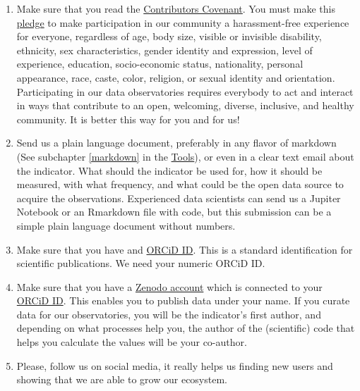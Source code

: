 \documentclass[
  a4paper,
  openany, a4paper, oneside]{book}
\begin{document}
\begin{enumerate}
\def\labelenumi{\arabic{enumi}.}
\item
  Make sure that you read the \href{https://www.contributor-covenant.org/}{Contributors Covenant}. You must make this \href{https://www.contributor-covenant.org/version/2/0/code_of_conduct/}{pledge} to make participation in our community a harassment-free experience for everyone, regardless of age, body size, visible or invisible disability, ethnicity, sex characteristics, gender identity and expression, level of experience, education, socio-economic status, nationality, personal appearance, race, caste, color, religion, or sexual identity and orientation. Participating in our data observatories requires everybody to act and interact in ways that contribute to an open, welcoming, diverse, inclusive, and healthy community. It is better this way for you and for us!
\item
  Send us a plain language document, preferably in any flavor of markdown (See subchapter \ref{markdown} in the \protect\hyperlink{markdown}{Tools}), or even in a clear text email about the indicator. What should the indicator be used for, how it should be measured, with what frequency, and what could be the open data source to acquire the observations. Experienced data scientists can send us a Jupiter Notebook or an Rmarkdown file with code, but this submission can be a simple plain language document without numbers.
\item
  Make sure that you have and \href{https://orcid.org/}{ORCiD ID}. This is a standard identification for scientific publications. We need your numeric ORCiD ID.
\item
  Make sure that you have a \href{https://zenodo.org/}{Zenodo account} which is connected to your \href{https://orcid.org/}{ORCiD ID}. This enables you to publish data under your name. If you curate data for our observatories, you will be the indicator's first author, and depending on what processes help you, the author of the (scientific) code that helps you calculate the values will be your co-author.
\item
  Please, follow us on social media, it really helps us finding new users and showing that we are able to grow our ecosystem.
\end{enumerate}
\end{document}
